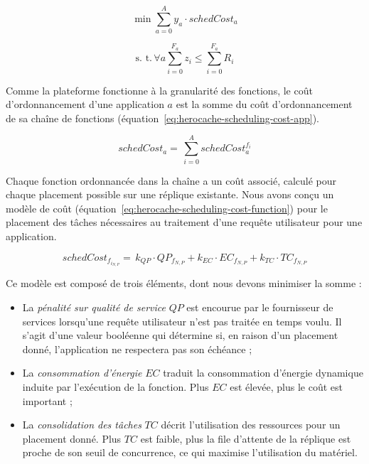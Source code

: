 \begin{equation}
    \min \sum_{a = 0}^{A} y_a \cdot schedCost_{a}
\label{eq:herocache-objective-scheduling}
\end{equation}

\begin{equation}
    \text{s. t.} \, \forall a \sum_{i = 0}^{F_a} z_i \leq \sum_{i = 0}^{F_a} R_{i}
\label{eq:herocache-constraint-scheduling}
\end{equation}

Comme la plateforme fonctionne à la granularité des fonctions, le coût d'ordonnancement d'une application $a$ est la somme du coût d'ordonnancement de sa chaîne de fonctions (équation~\ref{eq:herocache-scheduling-cost-app}).

\begin{equation}
    schedCost_{a} = \, \sum_{i = 0}^{A} schedCost^{{{f}_{i}}}_{a}
\label{eq:herocache-scheduling-cost-app}
\end{equation}

Chaque fonction ordonnancée dans la chaîne a un coût associé, calculé pour chaque placement possible sur une réplique existante. Nous avons conçu un modèle de coût (équation~\ref{eq:herocache-scheduling-cost-function}) pour le placement des tâches nécessaires au traitement d'une requête utilisateur pour une application.

\begin{equation}
    schedCost_{{f}_{{i}_{N, P}}} = \, k_{QP} \cdot QP_{{f}_{N, P}} + k_{EC} \cdot {EC}_{{f}_{N, P}} + k_{TC} \cdot TC_{{f}_{N, P}}
\label{eq:herocache-scheduling-cost-function}
\end{equation}

Ce modèle est composé de trois éléments, dont nous devons minimiser la somme :

\begin{itemize}
    \item La \textit{pénalité sur qualité de service} $QP$ est encourue par le fournisseur de services lorsqu'une requête utilisateur n'est pas traitée en temps voulu. Il s'agit d'une valeur booléenne qui détermine si, en raison d'un placement donné, l'application ne respectera pas son échéance ;
    \item La \textit{consommation d'énergie} $EC$ traduit la consommation d'énergie dynamique induite par l'exécution de la fonction. Plus $EC$ est élevée, plus le coût est important ;
    \item La \textit{consolidation des tâches} $TC$ décrit l'utilisation des ressources pour un placement donné. Plus $TC$ est faible, plus la file d'attente de la réplique est proche de son seuil de concurrence, ce qui maximise l'utilisation du matériel.
\end{itemize}

